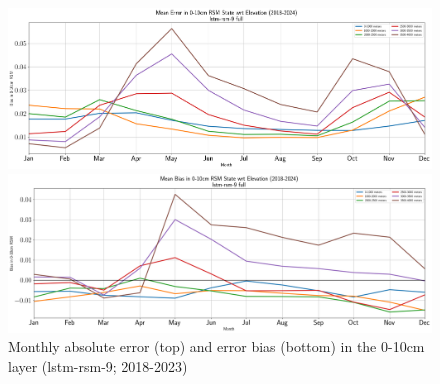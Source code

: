 \begin{figure}[h!]
    \centering
    \includegraphics[width=.99\linewidth,draft=false]{figures/grid-eval_qtrly/eval-grid_full_lstm-rsm-9_pixelwise-time-stats_monthly-elev-abs-err-state-rsm-10.png}

    \includegraphics[width=.99\linewidth,draft=false]{figures/grid-eval_qtrly/eval-grid_full_lstm-rsm-9_pixelwise-time-stats_monthly-elev-bias-state-rsm-10.png}

    \caption{Monthly absolute error (top) and error bias (bottom) in the 0-10cm layer (lstm-rsm-9; 2018-2023)}
    \label{bulk-eval_monthly-elev-err_rsm-10}
\end{figure}


